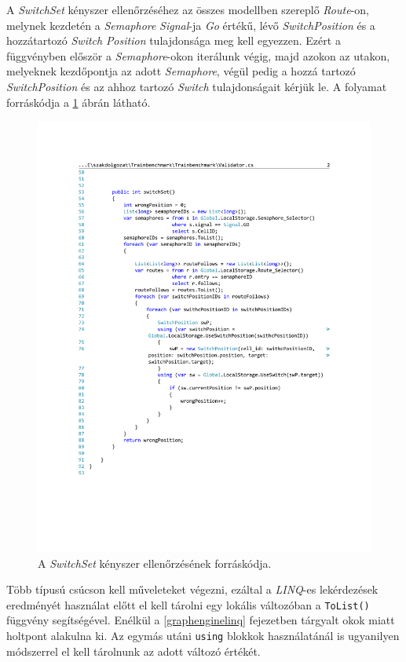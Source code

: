 A \emph{SwitchSet} kényszer ellenőrzéséhez az összes modellben szereplő \emph{Route}-on, melynek kezdetén a \emph{Semaphore} \emph{Signal}-ja \emph{Go} értékű, lévő \emph{SwitchPosition} és a hozzátartozó \emph{Switch} \emph{Position} tulajdonsága meg kell egyezzen. Ezért a függvényben először a \emph{Semaphore}-okon iterálunk végig, majd azokon az utakon, melyeknek kezdőpontja az adott \emph{Semaphore}, végül pedig a hozzá tartozó \emph{SwitchPosition} és az ahhoz tartozó \emph{Switch} tulajdonságait kérjük le. A folyamat forráskódja a \ref{fig:SwitchSetSource} ábrán látható.
\begin{figure}[H]
	\centering
	\includegraphics[width=\linewidth, keepaspectratio]{figures/Validator.pdf}
	\caption{A \emph{SwitchSet} kényszer ellenőrzésének forráskódja.}
	\label{fig:SwitchSetSource}
\end{figure}

Több típusú csúcson kell műveleteket végezni, ezáltal a \emph{LINQ}-es lekérdezések eredményét használat előtt el kell tárolni egy lokális változóban a \texttt{ToList()} függvény segítségével. Enélkül a \ref{graphenginelinq} fejezetben tárgyalt okok miatt holtpont alakulna ki. Az egymás utáni \texttt{using} blokkok használatánál is ugyanilyen módszerrel el kell tárolnunk az adott változó értékét.

